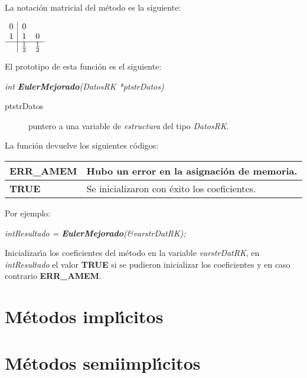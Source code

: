 La notaci\'on matricial del m\'etodo es la siguiente:

\begin{center}
$
\begin{array}{c|cc}
0 & 0 \\
1 & 1 & 0 \\
\hline
 & \frac{1}{2} & \frac{1}{2}
\end{array}
$
\end{center}

El prototipo de esta funci\'on es el siguiente:

\begin{center}
\emph{int \textbf{EulerMejorado}(DatosRK *ptstrDatos)}
\end{center}

\begin{description}
\item[ptstrDatos] puntero a una variable de \emph{estructura} del tipo
\emph{DatosRK}.
\end{description}

La funci\'on devuelve los siguientes c\'odigos:

\begin{center}
\begin{tabular}{|l|l|}
\hline
\textbf{ERR\_AMEM} & Hubo un error en la asignaci\'on de memoria. \\
\hline
\textbf{TRUE} & Se inicializaron con \'exito los coeficientes. \\
\hline
\end{tabular}
\end{center}

Por ejemplo:

\begin{center}
\emph{intResultado = \textbf{EulerMejorado}(\&varstrDatRK);}
\end{center}


Inicializar\'{\i}a los coeficientes del m\'etodo en la variable
\emph{varstrDatRK}, en \emph{intResultado} el valor \textbf{TRUE} si se pudieron
inicializar los coeficientes y en caso contrario \textbf{ERR\_AMEM}.

\section{M\'etodos impl\'{\i}citos}

\section{M\'etodos semiimpl\'{\i}citos}

